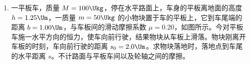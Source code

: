 \documentclass[\gkver]{gaokaozhenti}
\begin{document}
\begin{enumerate}
{解法二：

秤的结构如图所示。设秤钩 B 到提钮的距离为 $d$，秤杆和秤钩所受的重力为 $P$。秤水平时，$P$ 对提钮的力臂为 $d_{0}$，秤砣的质量为 $m$。


设想先把秤砣挂在秤杆读数为 $M_{1}$ 处，该处到提钮的距离为 $l_{1}$，平衡时有：

$M_{1}gd=Pd_{0}+mgl_{1}$ ①

再把秤砣挂在秤杆的读数为 $M_{2}$ 处，该处到提钮的距离为 $l_{2}$，平衡时有：

$M_{2}gd=Pd_{0}+mgl_{2}$ ②

解①、②两式得

$m=\frac{(M_{2}-M_{1})d}{l_{2}-l_{1}}$ ③

从秤杆上读出 $M_{1}$、$M_{2}$，用直尺测得 $d$ 和从 $M_{1}$ 处到 $M_{2}$ 处的距离 $l_{2}-l_{1}$，代入上式即得 $m$。评分标准：与解法一相同。

解法三：

秤的结构如图所示，秤钩 B 到提钮的距离为 $d$，A 是零刻度（即定盘星），D 是满刻度。设秤砣的质量为 $m$。当把秤砣挂放在零刻度上，秤平衡时秤钩是空的。若把秤砣从 A 点移到 D 点，对提钮增加的力矩为 $mgl$，$l$ 为 AD 间的距离，则在秤钩上挂一质量为 $M$ 的物体后，秤又平衡。这表示重物对提钮增加的力矩 $Mgd$ 与 $mgl$ 大小相等


即

$Mgd=mgl$ ①

解得 $m=\frac{Md}{l}$

从秤上读出最大秤量 $M$，用直尺量出 $d$ 和 $l$，代入上式即求出 $m$。

评分标准：全题 6 分。在分析正确，说理清楚的前提下，直接得到①式给 4 分；说出用直尺测量 $l$、$d$ 两个量给 2 分，缺少其中任何一个量，不给这 2 分。
}

\item
一平板车，质量 $M=100\Ukg$，停在水平路面上，车身的平板离地面的高度 $h=1.25\Um$，一质量 $m=50\Ukg$ 的小物块置于车的平板上，它到车尾端的距离 $b=1.00\Um$，与车板间的滑动摩擦系数 $\mu=0.20$，如图所示。今对平板车施一水平方向的恒力，使车向前行驶，结果物块从车板上滑落。物块刚离开车板的时刻，车向前行驶的距离 $s_{0}=2.0\Um$。求物块落地时，落地点到车尾的水平距离 $s$。不计路面与平板车间以及轮轴之间的摩擦。


\end{enumerate}
\end{document}
